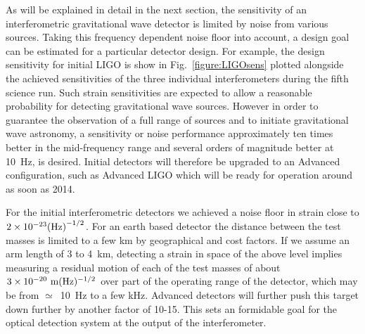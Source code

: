 \documentclass{article}
\begin{document}
As will be explained in detail in the next section, the sensitivity of
an interferometric gravitational wave detector is limited by noise
from various sources. Taking this frequency dependent noise floor into
account, a design goal can be estimated for a particular detector design.
For example, the design sensitivity for initial LIGO is show in Fig.~\ref{figure:LIGOsens}
plotted alongside the achieved sensitivities of the three individual interferometers
during the fifth science run. Such strain sensitivities are expected to allow a reasonable
probability for detecting gravitational wave sources. However in order to guarantee the observation
of a full range of sources and to initiate gravitational wave
astronomy, a sensitivity or noise performance approximately ten times
better in the mid-frequency range and several orders of magnitude
better at 10~Hz, is desired. Initial detectors will therefore be upgraded to an Advanced
configuration, such as Advanced LIGO which will be ready for operation around as soon as 2014.


For the initial interferometric detectors we achieved a noise floor in
strain close to $2 \times 10^{-23}{(\rm Hz)}^{-1/2}$. For an earth based detector the distance between the test
masses is limited to a few km by geographical and cost factors. If we
assume an arm length of 3 to 4~km, detecting a strain in space of the
above level implies measuring a residual motion of each of the test
masses of about $3 \times 10^{-20} {\rm \ m}(\rm Hz)^{-1/2}$ over part
of the operating range of the detector, which may be from
$\simeq$~10~Hz to a few kHz. Advanced detectors will further push this target down further by
another factor of 10-15. This sets an formidable goal for the
optical detection system at the output of the interferometer.
\end{document}
